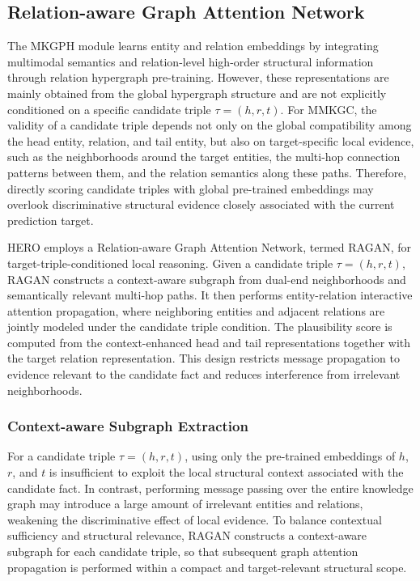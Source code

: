 \documentclass[a4paper,fleqn]{cas-sc}
\begin{document}
\subsection{Relation-aware Graph Attention Network}

The MKGPH module learns entity and relation embeddings by integrating multimodal semantics and relation-level high-order structural information through relation hypergraph pre-training. However, these representations are mainly obtained from the global hypergraph structure and are not explicitly conditioned on a specific candidate triple $\tau=(h,r,t)$. For MMKGC, the validity of a candidate triple depends not only on the global compatibility among the head entity, relation, and tail entity, but also on target-specific local evidence, such as the neighborhoods around the target entities, the multi-hop connection patterns between them, and the relation semantics along these paths. Therefore, directly scoring candidate triples with global pre-trained embeddings may overlook discriminative structural evidence closely associated with the current prediction target.

HERO employs a Relation-aware Graph Attention Network, termed RAGAN, for target-triple-conditioned local reasoning. Given a candidate triple $\tau=(h,r,t)$, RAGAN constructs a context-aware subgraph from dual-end neighborhoods and semantically relevant multi-hop paths. It then performs entity-relation interactive attention propagation, where neighboring entities and adjacent relations are jointly modeled under the candidate triple condition. The plausibility score is computed from the context-enhanced head and tail representations together with the target relation representation. This design restricts message propagation to evidence relevant to the candidate fact and reduces interference from irrelevant neighborhoods.

\subsubsection{Context-aware Subgraph Extraction}

For a candidate triple $\tau=(h,r,t)$, using only the pre-trained embeddings of $h$, $r$, and $t$ is insufficient to exploit the local structural context associated with the candidate fact. In contrast, performing message passing over the entire knowledge graph may introduce a large amount of irrelevant entities and relations, weakening the discriminative effect of local evidence. To balance contextual sufficiency and structural relevance, RAGAN constructs a context-aware subgraph for each candidate triple, so that subsequent graph attention propagation is performed within a compact and target-relevant structural scope.
\end{document}
